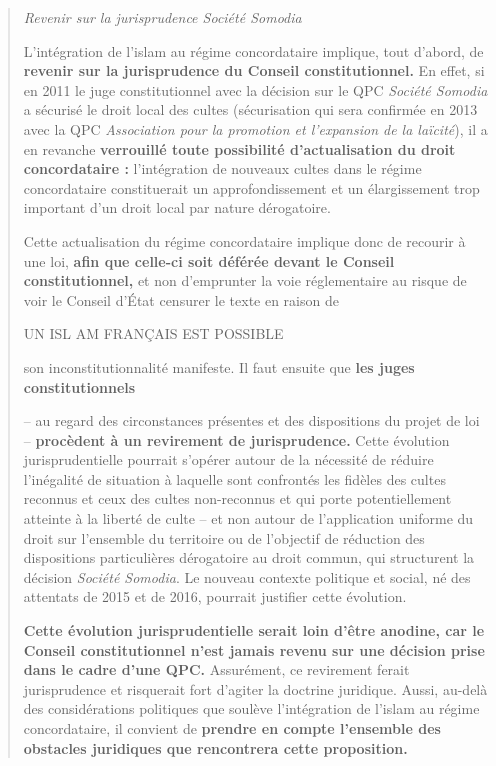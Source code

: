 \begin{quote}
\emph{Revenir sur la jurisprudence Société Somodia}

L'intégration de l'islam au régime concordataire implique, tout d'abord,
de \textbf{revenir sur la jurisprudence du Conseil constitutionnel.} En
effet, si en 2011 le juge constitutionnel avec la décision sur le QPC
\emph{Société Somodia} a sécurisé le droit local des cultes
(sécurisation qui sera confirmée en 2013 avec la QPC \emph{Association
pour la promotion et l'expansion de la laïcité}), il a en revanche
\textbf{verrouillé toute possibilité d'actualisation du droit
concordataire :} l'intégration de nouveaux cultes dans le régime
concordataire constituerait un approfondissement et un élargissement
trop important d'un droit local par nature dérogatoire.

Cette actualisation du régime concordataire implique donc de recourir à
une loi, \textbf{afin que celle-ci soit déférée devant le Conseil
constitutionnel,} et non d'emprunter la voie réglementaire au risque de
voir le Conseil d'État censurer le texte en raison de

UN ISL AM FRANÇAIS EST POSSIBLE

son inconstitutionnalité manifeste. Il faut ensuite que \textbf{les
juges constitutionnels}

-- au regard des circonstances présentes et des dispositions du projet
de loi -- \textbf{procèdent à un revirement de jurisprudence.} Cette
évolution jurisprudentielle pourrait s'opérer autour de la nécessité de
réduire l'inégalité de situation à laquelle sont confrontés les fidèles
des cultes reconnus et ceux des cultes non-reconnus et qui porte
potentiellement atteinte à la liberté de culte -- et non autour de
l'application uniforme du droit sur l'ensemble du territoire ou de
l'objectif de réduction des dispositions particulières dérogatoire au
droit commun, qui structurent la décision \emph{Société Somodia}. Le
nouveau contexte politique et social, né des attentats de 2015 et de
2016, pourrait justifier cette évolution.

\textbf{Cette évolution jurisprudentielle serait loin d'être anodine,
car le Conseil constitutionnel n'est jamais revenu sur une décision
prise dans le cadre d'une QPC.} Assurément, ce revirement ferait
jurisprudence et risquerait fort d'agiter la doctrine juridique. Aussi,
au-delà des considérations politiques que soulève l'intégration de
l'islam au régime concordataire, il convient de \textbf{prendre en
compte l'ensemble des obstacles juridiques que rencontrera cette
proposition.}


\end{quote}
